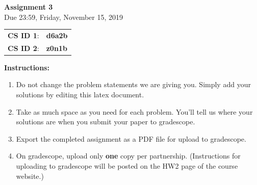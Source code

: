 \documentclass[11pt,table]{article}
\renewcommand{\arraystretch}{2}
\begin{document}

\begin{center}
    \LARGE
    \textbf{Assignment 3}
    \\[1ex]
    \Large Due 23:59, Friday, November 15, 2019 \\
\end{center}

\begin{table}[h]
    \centering
    \renewcommand{\arraystretch}{1.5}
    \begin{tabular}{ll}
        \textbf{CS ID 1}: & \textbf{d6a2b}\\
        \textbf{CS ID 2}: & \textbf{z0n1b}\\
    \end{tabular}
\end{table}

\textbf{Instructions:}
\begin{enumerate}
\item Do not change the problem statements we are giving you. Simply add your solutions by editing this latex document. 
\item Take as much space as you need for each problem. You'll tell us where your solutions are when you submit your paper to gradescope. 
\item Export the completed assignment as a PDF file for upload to gradescope.
\item On gradescope, upload only \textbf{one} copy per partnership. (Instructions for uploading to gradescope will be posted on the HW2 page of the course website.)
\end{enumerate}
\end{document}
